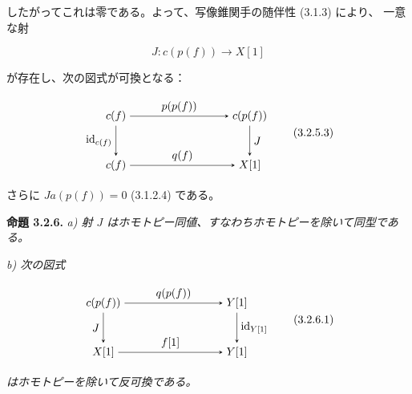 \clearpage
{}%
したがってこれは零である。よって、写像錐関手の随伴性 (3.1.3) により、
一意な射

\begin{equation}
  J\colon c(p(f))\longrightarrow X[1]
  \tag{3.2.5.2}
\end{equation}

\noindent が存在し、次の図式が可換となる：

\begin{equation}
  \begin{tikzpicture}[>=stealth,baseline=(current bounding box.center)]
    \node (Cf1) at (0,1.55) {$c(f)$};
    \node (Cpf) at (4.2,1.55) {$c(p(f))$};
    \node (Cf2) at (0,0) {$c(f)$};
    \node (Xs)  at (4.2,0) {$X[1]$};
    \draw[->] (Cf1) -- node[above] {$p(p(f))$} (Cpf);
    \draw[->] (Cf1) -- node[left] {$\operatorname{id}_{c(f)}$} (Cf2);
    \draw[->] (Cpf) -- node[right] {$J$} (Xs);
    \draw[->] (Cf2) -- node[above] {$q(f)$} (Xs);
  \end{tikzpicture}
  \tag{3.2.5.3}
\end{equation}

\noindent さらに $Ja(p(f))=0$ (3.1.2.4) である。

\noindent\textbf{命題 3.2.6.}\quad
{}
\emph{a) 射 $J$ はホモトピー同値、すなわちホモトピーを除いて同型である。}

\emph{b) 次の図式}

\begin{equation}
  \begin{tikzpicture}[>=stealth,baseline=(current bounding box.center)]
    \node (Cpf) at (0,1.55) {$c(p(f))$};
    \node (Ys1) at (4.2,1.55) {$Y[1]$};
    \node (Xs)  at (0,0) {$X[1]$};
    \node (Ys2) at (4.2,0) {$Y[1]$};
    \draw[->] (Cpf) -- node[above] {$q(p(f))$} (Ys1);
    \draw[->] (Cpf) -- node[left] {$J$} (Xs);
    \draw[->] (Ys1) -- node[right] {$\operatorname{id}_{Y[1]}$} (Ys2);
    \draw[->] (Xs) -- node[above] {$f[1]$} (Ys2);
  \end{tikzpicture}
  \tag{3.2.6.1}
\end{equation}

\noindent\emph{はホモトピーを除いて反可換である。}

